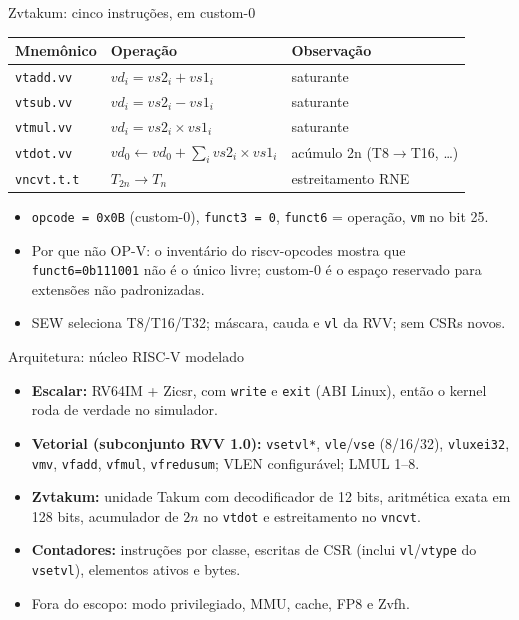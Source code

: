 \documentclass[aspectratio=169,10pt]{beamer}
\begin{document}
\begin{frame}{Zvtakum: cinco instruções, em custom-0}
	\begin{table}
		\centering
		\small
		\begin{tabular}{lll}
			\toprule
			Mnemônico & Operação & Observação \\
			\midrule
			\texttt{vtadd.vv} & $vd_i = vs2_i + vs1_i$ & saturante \\
			\texttt{vtsub.vv} & $vd_i = vs2_i - vs1_i$ & saturante \\
			\texttt{vtmul.vv} & $vd_i = vs2_i \times vs1_i$ & saturante \\
			\texttt{vtdot.vv} & $vd_0 \leftarrow vd_0 + \sum_i vs2_i \times vs1_i$
			                  & acúmulo 2n (T8$\to$T16, \dots) \\
			\texttt{vncvt.t.t} & $T_{2n} \to T_n$ & estreitamento RNE \\
			\bottomrule
		\end{tabular}
	\end{table}
	\begin{itemize}
		\item \texttt{opcode = 0x0B} (custom-0), \texttt{funct3 = 0},
		      \texttt{funct6} = operação, \texttt{vm} no bit 25.
		\item Por que não OP-V: o inventário do riscv-opcodes mostra que
		      \texttt{funct6=0b111001} não é o único livre; custom-0 é o espaço
		      reservado para extensões não padronizadas.
		\item SEW seleciona T8/T16/T32; máscara, cauda e \texttt{vl} da RVV;
		      sem CSRs novos.
	\end{itemize}
\end{frame}

\begin{frame}{Arquitetura: núcleo RISC-V modelado}
	\begin{itemize}
		\item \textbf{Escalar:} RV64IM + Zicsr, com \texttt{write} e \texttt{exit}
		      (ABI Linux), então o kernel roda de verdade no simulador.
		\item \textbf{Vetorial (subconjunto RVV 1.0):} \texttt{vsetvl*},
		      \texttt{vle}/\texttt{vse} (8/16/32), \texttt{vluxei32},
		      \texttt{vmv}, \texttt{vfadd}, \texttt{vfmul},
		      \texttt{vfredusum}; VLEN configurável; LMUL 1--8.
		\item \textbf{Zvtakum:} unidade Takum com decodificador de 12 bits,
		      aritmética exata em 128 bits, acumulador de $2n$ no
		      \texttt{vtdot} e estreitamento no \texttt{vncvt}.
		\item \textbf{Contadores:} instruções por classe, escritas de CSR
		      (inclui \texttt{vl}/\texttt{vtype} do \texttt{vsetvl}),
		      elementos ativos e bytes.
		\item Fora do escopo: modo privilegiado, MMU, cache, FP8 e Zvfh.
	\end{itemize}
\end{frame}
\end{document}
